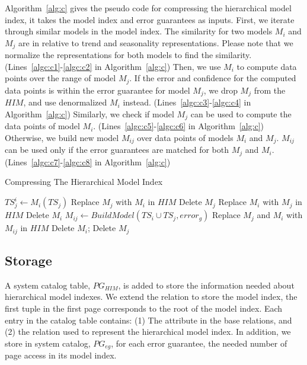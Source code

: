 \documentclass{sigmod}
\begin{document}
Algorithm~\ref{alg:c} gives the pseudo code for compressing the hierarchical model index, it takes the model index and error guarantees as inputs.
First, we iterate through similar models in the model index. The similarity for two models $M_i$ and $M_j$ are  in relative to trend and seasonality representations. Please note that we normalize the representations for both models to find the similarity. (Lines~\ref{algc:c1}-\ref{algc:c2} in Algorithm~\ref{alg:c}) Then, we use $M_i$ to compute data points over the range of model $M_j$. If the error and confidence for the computed data points is within the error guarantee for model $M_j$, we drop $M_j$ from the $HIM$, and use denormalized $M_i$ instead. (Lines~\ref{algc:c3}-\ref{algc:c4} in Algorithm~\ref{alg:c}) Similarly, we check if model $M_j$ can be used to compute the data points of model $M_i$. (Lines~\ref{algc:c5}-\ref{algc:c6} in Algorithm~\ref{alg:c}) Otherwise, we build new model $M_{ij}$ over data points of models $M_i$ and $M_j$. $M_{ij}$ can be used only if the error guarantees are matched for both $M_j$ and $M_i$. (Lines~\ref{algc:c7}-\ref{algc:c8} in Algorithm~\ref{alg:c})
\begin{algorithm}[tp]
\caption{Compressing The Hierarchical Model Index}
\label{alg:c}
\begin{algorithmic}[1]
 \label{algc:c1}
\State $TS^i_j \gets  M_i(TS_j)$ \label{algc:c2}
 \label{algc:c3}
\State Replace $M_j$ with $M_i$ in $HIM$ 
\State Delete $M_j$ \label{algc:c4}
 \label{algc:c5}
\State Replace $M_i$ with $M_j$ in $HIM$
\State Delete $M_i$ \label{algc:c6}
\Else 
\State $M_{ij} \gets BuildModel(TS_i \cup TS_j, error_g)$ \label{algc:c7}
\State Replace $M_j$ and $M_i$ with $M_{ij}$ in $HIM$
\State Delete $M_i$; Delete $M_j$ \label{algc:c8}
\EndIf
\EndIf
\EndFor
\EndProcedure
\end{algorithmic}
\end{algorithm}



\subsection{Storage}
 A system catalog table, $PG_{HIM}$, is added to store the information needed about hierarchical model indexes. We extend the relation  to store the  model index, the first tuple in the first page corresponds to the root of the model index. Each entry in the catalog table contains: (1) The attribute in the base relations, and (2) the relation used to represent the hierarchical model index. In addition, we store in system catalog, $PG_{eg}$,  for each error guarantee, the needed number of page access in its model index.
 
\end{document}
